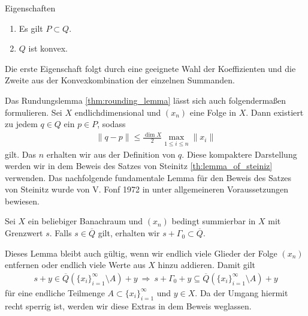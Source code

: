 \begin{genericthm}{Eigenschaften}  
	\begin{enumerate}
		\item Es gilt $ P \subset Q $.
		\item $ Q $ ist konvex.
	\end{enumerate}
\end{genericthm}
Die erste Eigenschaft folgt durch eine geeignete Wahl der Koeffizienten und die Zweite aus der Konvexkombination der einzelnen Summanden.

Das Rundungslemma \ref{thm:rounding_lemma} lässt sich auch folgendermaßen formulieren.
Sei $ X $ endlichdimensional und $ (x_n) $ eine Folge in $ X $.
Dann existiert zu jedem $ q \in Q $ ein $ p \in P $, sodass
\begin{align}
	\| q - p \| \leq \frac{\dim X}{2} \max_{1 \leq i \leq n} \|x_i \|
\end{align}
gilt.
Das $ n $ erhalten wir aus der Definition von $ q $. Diese kompaktere Darstellung werden wir in dem Beweis des Satzes von Steinitz \ref{th:lemma_of_steiniz} verwenden.
Das nachfolgende fundamentale Lemma für den Beweis des Satzes von Steinitz wurde von V. Fonf 1972 in \cite{Fonf1972} unter allgemeineren Voraussetzungen bewiesen.


\begin{lem}\label{thm:affine_space_is_subset}
	Sei $ X $ ein beliebiger Banachraum und $ (x_n) $ bedingt summierbar in $ X $ mit Grenzwert $ s $.
	Falls $ s \in \overline{Q} $ gilt, erhalten wir $ s + \Gamma_0 \subset \overline{Q} $.
\end{lem}

Dieses Lemma bleibt auch gültig, wenn wir endlich viele Glieder der Folge $ (x_n) $ entfernen oder endlich viele Werte aus $ X $ hinzu addieren. Damit gilt
\begin{align}\label{eq:affine_space_is_subset_special}
	s + y \in \overline{Q}(\{x_i\}_{i = 1}^\infty \setminus A) +y
	\ \Rightarrow \
	s + \Gamma_0 + y \subseteq  \overline{Q}(\{x_i\}_{i = 1}^\infty \setminus A) +y
\end{align}
für eine endliche Teilmenge $ A \subset \{x_i\}_{i = 1}^\infty $ und $ y \in X $. Da der Umgang hiermit recht sperrig ist, werden wir diese Extras in dem Beweis weglassen.


